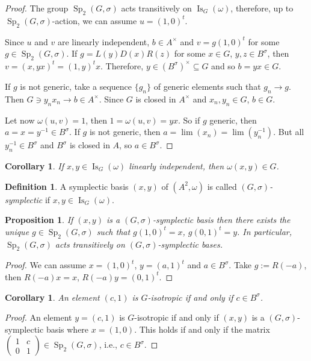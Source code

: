 \documentclass[a4paper,oneside,11pt]{amsart}
\DeclareMathOperator{\Sp}{Sp}
\DeclareMathOperator{\Is}{Is}
\theoremstyle{plain}
\newtheorem{cor}[teo]{Corollary}
\newtheorem{prop}[teo]{Proposition}
\theoremstyle{definition}
\newtheorem{df}[teo]{Definition}
\theoremstyle{remark}
\newcommand{\defin}{\emph}
\begin{document}
\begin{proof}
The group $\Sp_2(G,\sigma)$ acts transitively on $\Is_G(\omega)$, therefore, up to $\Sp_2(G,\sigma)$-action, we can assume $u=(1,0)^t$.

Since $u$ and $v$ are linearly independent, $b\in A^\times$ and $v=g(1,0)^t$ for some $g\in\Sp_2(G,\sigma)$. If $g=L(y)D(x)R(z)$ for some $x\in G$, $y,z\in B^{\sigma}$, then $v=(x,yx)^t=(1,y)^tx$. Therefore, $y\in (B^{\sigma})^\times\subseteq G$ and so $b=yx\in G$.

If $g$ is not generic, take a sequence $\{g_n\}$ of generic elements such that $g_n\to g$. Then $G\ni y_nx_n\to b\in A^\times$. Since $G$ is closed in $A^\times$ and $x_n,y_n\in G$, $b\in G$.

Let now $\omega(u,v)=1$, then $1=\omega(u,v)=yx$. So if $g$ generic, then $a=x=y^{-1}\in B^{\sigma}$. If $g$ is not generic, then $a=\lim(x_n)=\lim(y_n^{-1})$. But all $y_n^{-1}\in B^{\sigma}$ and $B^{\sigma}$ is closed in $A$, so $a\in B^{\sigma}$.
\end{proof}

\begin{cor}
If $x,y\in\Is_G(\omega)$ linearly independent, then $\omega(x,y)\in G$.
\end{cor}

\begin{df}
A symplectic basis $(x,y)$ of $(A^2,\omega)$ is called \defin{$(G,\sigma)$-symplectic} if $x,y\in\Is_G(\omega)$.
\end{df}

\begin{prop}\label{trans_bas}
If $(x,y)$ is a $(G,\sigma)$-symplectic basis then there exists the unique $g\in \Sp_2(G,\sigma)$ such that $g(1,0)^t=x$, $g(0,1)^t=y$. In particular, $\Sp_2(G,\sigma)$ acts transitively on $(G,\sigma)$-symplectic bases.
\end{prop}

\begin{proof}
We can assume $x=(1,0)^t$, $y=(a,1)^t$ and $a\in B^{\sigma}$. Take $g:=R(-a)$, then $R(-a)x=x$, $R(-a)y=(0,1)^t$.
\end{proof}

\begin{cor}\label{cor:(c,1)-isotropic}
    An element $(c,1)$ is $G$-isotropic if and only if $c\in B^\sigma$.
\end{cor}

\begin{proof}
    An element $y=(c,1)$ is $G$-isotropic if and only if  $(x,y)$ is a $(G,\sigma)$-symplectic basis where $x=(1,0)$. This holds if and only if the matrix $\begin{pmatrix}
        1 & c \\
        0 & 1
    \end{pmatrix}\in\Sp_2(G,\sigma)$, i.e., $c\in B^\sigma$.
\end{proof}
\end{document}

